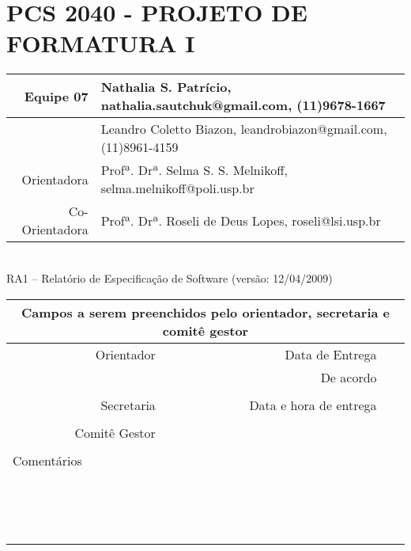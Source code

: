\documentclass[a4paper,12pt,font=plain,header=plain]{abnt}
\begin{document}
  \setcounter{secnumdepth}{-1}
  \capa

  \renewenvironment{center}{}{}
  \section{PCS 2040 - PROJETO DE FORMATURA I}

    \begin{tabular}[|l|]{ |r|l| }
    \hline
			Equipe 07 & Nathalia S. Patrício, nathalia.sautchuk@gmail.com, (11)9678-1667 \\
		\hline
			& Leandro Coletto Biazon, leandrobiazon@gmail.com, (11)8961-4159 \\
		\hline
			Orientadora & Profª. Drª. Selma S. S. Melnikoff, selma.melnikoff@poli.usp.br \\
		\hline
			Co-Orientadora & Profª. Drª. Roseli de Deus Lopes, roseli@lsi.usp.br \\
		\hline
		\end{tabular} \\

		RA1 – Relatório de Especificação de Software (versão: 12/04/2009) \\

		\begin{tabular}{ |r|r|r| }

		\hline
			\multicolumn{3}{|c|}{Campos a serem preenchidos pelo orientador, secretaria e comitê gestor} \\
		\hline
			Orientador & Data de Entrega &  \\
		\hline
			& De acordo &  \\
		\hline
			& &  \\
		\hline
			Secretaria & Data e hora de entrega &  \\
		\hline
			&  &  \\
		\hline
			Comitê Gestor &  &  \\
		\hline
		&  &  \\
		\hline
			\multicolumn{3}{|l|}{Comentários} \\
			\multicolumn{3}{|l|}{} \\
			\multicolumn{3}{|l|}{} \\
			\multicolumn{3}{|l|}{} \\
			\multicolumn{3}{|l|}{} \\
			\multicolumn{3}{|l|}{} \\
			\multicolumn{3}{|l|}{} \\
			\multicolumn{3}{|l|}{} \\
			\multicolumn{3}{|l|}{} \\
			\multicolumn{3}{|l|}{} \\
			\multicolumn{3}{|l|}{} \\
			\multicolumn{3}{|l|}{} \\
			\multicolumn{3}{|l|}{} \\
			\multicolumn{3}{|l|}{} \\
			\multicolumn{3}{|l|}{} \\
			\multicolumn{3}{|l|}{} \\
		\hline
		\end{tabular}
\end{document}
